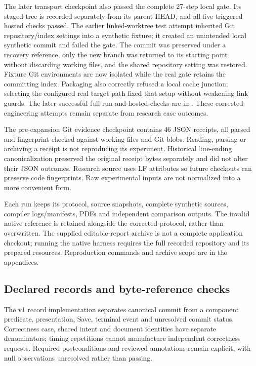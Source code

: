The later transport checkpoint  also passed the complete
27-step local gate. Its staged tree is recorded separately from its parent
HEAD, and all five triggered hosted checks passed. The earlier linked-worktree
test attempt inherited Git repository/index settings into a synthetic fixture;
it created an unintended local synthetic commit and failed the gate. The
commit was preserved under a recovery reference, only the new branch was
returned to its starting point without discarding working files, and the
shared repository setting was restored. Fixture Git environments are now
isolated while the real gate retains the committing index. Packaging also
correctly refused a local cache junction; selecting the configured real target
path fixed that setup without weakening link guards. The later successful
full run and hosted checks are in
. These corrected
engineering attempts remain separate from research case outcomes.

The pre-expansion Git evidence checkpoint contains 46 JSON receipts, all
parsed and fingerprint-checked against working files and Git blobs. Reading,
parsing or archiving a receipt is not reproducing its experiment. Historical
line-ending canonicalization preserved the original receipt bytes separately
and did not alter their JSON outcomes. Research source uses LF attributes so
future checkouts can preserve code fingerprints. Raw experimental inputs are
not normalized into a more convenient form.

Each run keeps its protocol, source snapshots, complete synthetic sources,
compiler logs/manifests, PDFs and independent comparison outputs. The invalid
native reference is retained alongside the corrected protocol, rather than
overwritten. The supplied editable-report archive is not a complete application
checkout; running the native harness requires the full recorded repository and
its prepared resources. Reproduction commands and archive scope are in the
appendices.

\subsection{Declared records and byte-reference checks}
The v1 record implementation separates canonical commit from a
component predicate, presentation, Save, terminal event and unresolved commit
status. Correctness case, shared intent and document identities have separate
denominators; timing repetitions cannot manufacture independent correctness
requests. Required postconditions and reviewed annotations remain explicit,
with null observations unresolved rather than passing.


